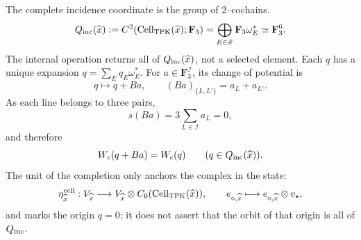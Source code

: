 The complete incidence coordinate is the group of 2--cochains.
\begin{equation}
\label{eq:pdfv2-cor-q-incidencia-total}
 Q_{\rm inc}(\widehat x):=
 C^2(\operatorname{Cell}_{\rm TPK}(\widehat x);\mathbf F_3)
 =\bigoplus_{E\in\mathscr E}\mathbf F_3\omega_E^*
 \simeq\mathbf F_3^6.
\end{equation}
The internal operation returns all of \(Q_{\rm inc}(\widehat x)\), not a
selected element. Each \(q\) has a unique expansion
\(q=\sum_Eq_E\omega_E^*\). For
\(a\in\mathbf F_3^{\mathscr I}\), its change of potential is
\begin{equation}
\label{eq:pdfv2-cor-collar-variacion}
 q\longmapsto q+Ba,\qquad (Ba)_{\{L,L'\}}=a_L+a_{L'}.
\end{equation}
As each line belongs to three pairs,
\[
 s(Ba)=3\sum_{L\in\mathscr I}a_L=0,
\]
and therefore
\begin{equation}
\label{eq:pdfv2-cor-wc-invariante-celular}
 W_c(q+Ba)=W_c(q)\qquad(q\in Q_{\rm inc}(\widehat x)).
\end{equation}
The unit of the completion only anchors the complex in the state:
\begin{equation}
\label{eq:pdfv2-cor-cell-unidad}
 \eta^{\rm cell}_{\widehat x}:V_{\widehat x}\longrightarrow
 V_{\widehat x}\otimes C_0(\operatorname{Cell}_{\rm TPK}(\widehat x)),\qquad
 e_{\diamond,\widehat x}\longmapsto
 e_{\diamond,\widehat x}\otimes v_\star,
\end{equation}
and marks the origin \(q=0\); it does not assert that the orbit of that origin is all of
\(Q_{\rm inc}\).

